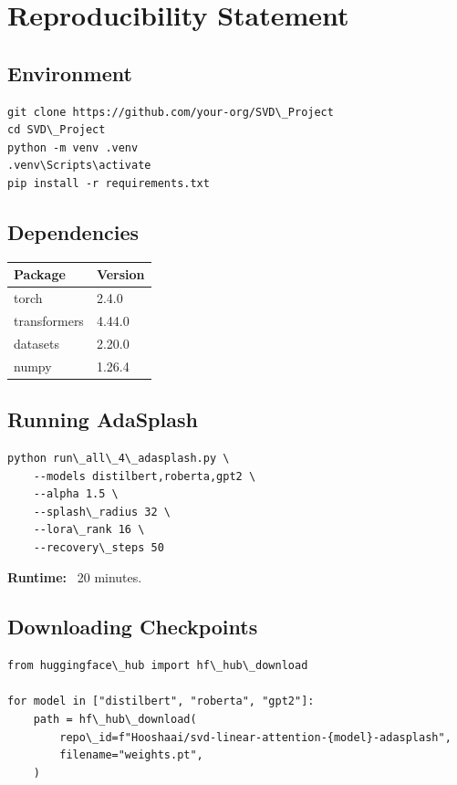 
\section{Reproducibility Statement}

\subsection{Environment}

\begin{lstlisting}
git clone https://github.com/your-org/SVD\_Project
cd SVD\_Project
python -m venv .venv
.venv\Scripts\activate
pip install -r requirements.txt
\end{lstlisting}

\subsection{Dependencies}

\begin{table}[H]
\centering
\small
\begin{tabular}{ll}
\toprule
\textbf{Package} & \textbf{Version} \\
\midrule
torch & 2.4.0 \\
transformers & 4.44.0 \\
datasets & 2.20.0 \\
numpy & 1.26.4 \\
\bottomrule
\end{tabular}
\end{table}

\subsection{Running AdaSplash}

\begin{lstlisting}
python run\_all\_4\_adasplash.py \
    --models distilbert,roberta,gpt2 \
    --alpha 1.5 \
    --splash\_radius 32 \
    --lora\_rank 16 \
    --recovery\_steps 50
\end{lstlisting}

\textbf{Runtime:} ~20 minutes.

\subsection{Downloading Checkpoints}

\begin{lstlisting}
from huggingface\_hub import hf\_hub\_download

for model in ["distilbert", "roberta", "gpt2"]:
    path = hf\_hub\_download(
        repo\_id=f"Hooshaai/svd-linear-attention-{model}-adasplash",
        filename="weights.pt",
    )
\end{lstlisting}

